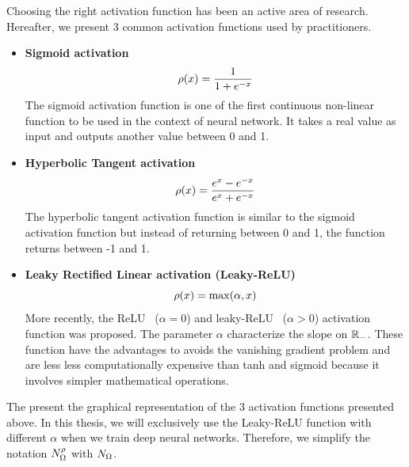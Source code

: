 Choosing the right activation function has been an active area of research. 
Hereafter, we present 3 common activation functions used by practitioners.
\begin{itemize}
  \item \textbf{Sigmoid activation} \cite{han1995influence}
    \begin{equation*}
      \rho(x) = \frac{1}{1+e^{-x}} 
    \end{equation*}
    The sigmoid activation function is one of the first continuous non-linear function to be used in the context of neural network. It takes a real value as input and outputs another value between 0 and 1.
  \item \textbf{Hyperbolic Tangent activation} \cite{karlik2011performance}
    \begin{equation*}
      \rho(x) = \frac{e^x - e^{-x}}{e^x + e^{-x}}
    \end{equation*}
    The hyperbolic tangent activation function is similar to the sigmoid activation function but instead of returning between 0 and 1, the function returns between -1 and 1.     
  \item \textbf{Leaky Rectified Linear activation (Leaky-ReLU)} \cite{maas2013rectifier}
    \begin{equation*}
      \rho(x) = \max(\alpha, x)
    \end{equation*}
    More recently, the ReLU~\cite{nair2010rectified} ($\alpha = 0$) and leaky-ReLU~\cite{maas2013rectifier} ($\alpha > 0$) activation function was proposed.
    The parameter $\alpha$ characterize the slope on $\mathbb{R}_-$.
    These function have the advantages to avoids the vanishing gradient problem and are less less computationally expensive than tanh and sigmoid because it involves simpler mathematical operations.
\end{itemize}

\noindent
The  present the graphical representation of the 3 activation functions presented above.
In this thesis, we will exclusively use the Leaky-ReLU function with different $\alpha$ when we train deep neural networks.
Therefore, we simplify the notation $N^\rho_\Omega$ with $N_\Omega$.


